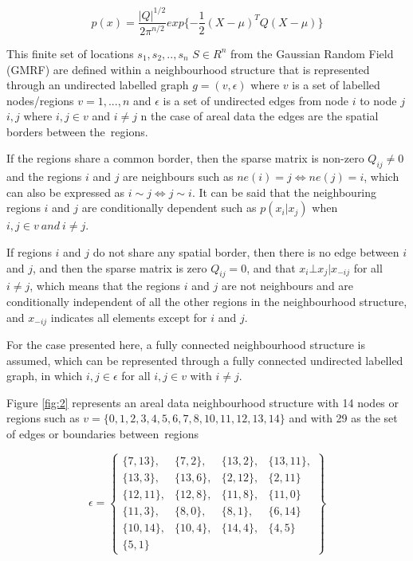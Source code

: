 \documentclass[energies,article,accept,pdftex,moreauthors]{Definitions/mdpi}
\begin{document}
    \begin{linenomath}
\begin{equation} \label{eq:13}
    p(x)=\frac{ |Q |^{1/2}}{2\pi^{n/2}} exp\{-\frac{1}{2}(X-\mu)^{T}Q(X-\mu)\}
    \end{equation}
    \end{linenomath}
    
    This finite set of locations \(s_1,s_2,..,s_n\) \(S \in R^{n}\) from the Gaussian Random Field (GMRF) are defined within a neighbourhood structure that is represented through an undirected labelled graph \(g=(v,\epsilon)\) where $v$ is a set of labelled nodes/regions \(v={1,...,n}\) and $\epsilon$ is a set of undirected edges from node $i$ to node $j$ ${i,j}$ where \(i,j \in v\) and $i \neq j$ n the case of areal data the edges are the spatial borders between the~regions.
    
    If the regions share a common border, then the sparse matrix is non-zero $Q_{ij} \neq 0$ and the regions $i$ and $j$ are neighbours such as \(ne(i)=j \Longleftrightarrow ne(j)=i\), which can also be expressed as  \(i \sim j \Longleftrightarrow j \sim i\). It can be said that the neighbouring regions $i$ and $j$ are conditionally dependent such as \(p(x_i \vert x_j)\) when \(i,j \in v \: and \: i \neq j\).
    
    If regions $i$ and $j$ do not share any spatial border, then there is no edge between $i$ and $j$, and then the sparse matrix is zero \(Q_{ij}=0\), and that \(x_i \bot x_j \vert x_{-ij}\) for all \(i \neq j\), which means that the regions $i$ and $j$ are not neighbours and are conditionally independent of all the other regions in the neighbourhood structure, and \(x_{-ij}\) indicates all elements except for $i$ and $j$. %
    
    For the case presented here, a fully connected neighbourhood structure is assumed, which can be represented through a fully connected undirected labelled graph, in which \({i,j} \in \epsilon\) for all \(i,j \in v\) with \(i \neq j\). %


    
    Figure \ref{fig:2} %
    represents an areal data neighbourhood structure with 14 nodes or regions such as \(v=\{0,1,2,3,4,5,6,7,8,10,11,12,13,14\}\) and with 29 as the set of edges or boundaries between~regions
    
    \begin{equation*}
    \epsilon =
    \begin{Bmatrix}
        \{7,13\}, & \{7,2\}, & \{13,2\}, & \{13,11\}, \\
        \{13,3\}, & \{13,6\}, & \{2,12\}, & \{2,11\} \\
        \{12,11\}, & \{12,8\}, & \{11,8\}, & \{11,0\} \\
        \{11,3\}, & \{8,0\}, & \{8,1\}, &  \{6,14\}\\
        \{10,14\}, & \{10,4\}, & \{14,4\}, & \{4,5\} \\
        \{5,1\}
    \end{Bmatrix}
    \end{equation*}
    
\end{document}

